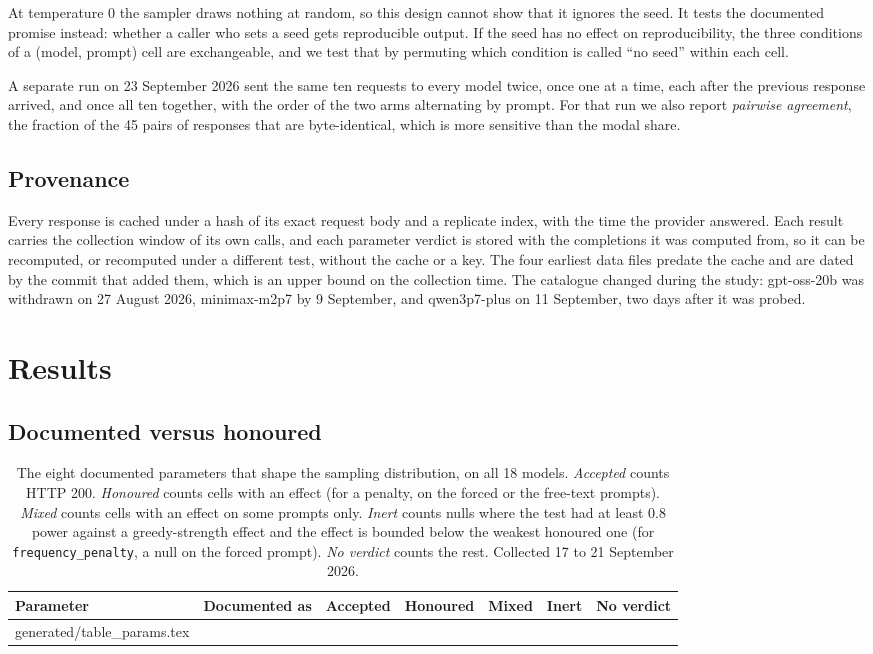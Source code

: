 \documentclass[10pt]{article}
\makeatletter
\newcommand{\p}[1]{\texttt{#1}}
\newcommand{\inputrows}[1]{\@@input #1 }
\makeatother
\begin{document}
At temperature 0 the sampler draws nothing at random, so this design cannot show that it ignores the seed. It tests the documented promise instead: whether a caller who sets a seed gets reproducible output. If the seed has no effect on reproducibility, the three conditions of a (model, prompt) cell are exchangeable, and we test that by permuting which condition is called ``no seed'' within each cell.

A separate run on 23 September 2026 sent the same ten requests to every model twice, once one at a time, each after the previous response arrived, and once all ten together, with the order of the two arms alternating by prompt. For that run we also report \emph{pairwise agreement}, the fraction of the 45 pairs of responses that are byte-identical, which is more sensitive than the modal share.

\subsection{Provenance}

Every response is cached under a hash of its exact request body and a replicate index, with the time the provider answered. Each result carries the collection window of its own calls, and each parameter verdict is stored with the completions it was computed from, so it can be recomputed, or recomputed under a different test, without the cache or a key. The four earliest data files predate the cache and are dated by the commit that added them, which is an upper bound on the collection time. The catalogue changed during the study: gpt-oss-20b was withdrawn on 27 August 2026, minimax-m2p7 by 9 September, and qwen3p7-plus on 11 September, two days after it was probed.

\section{Results}

\subsection{Documented versus honoured}
\label{sec:gap}

\begin{table}[t]
\centering
\small
\caption{The eight documented parameters that shape the sampling distribution, on all 18 models. \emph{Accepted} counts HTTP 200. \emph{Honoured} counts cells with an effect (for a penalty, on the forced or the free-text prompts). \emph{Mixed} counts cells with an effect on some prompts only. \emph{Inert} counts nulls where the test had at least 0.8 power against a greedy-strength effect and the effect is bounded below the weakest honoured one (for \p{frequency\_penalty}, a null on the forced prompt). \emph{No verdict} counts the rest. Collected 17 to 21 September 2026.}
\label{tab:gap}
\begin{tabular}{llccccc}
\toprule
Parameter & Documented as & Accepted & Honoured & Mixed & Inert & No verdict \\
\midrule
\inputrows{generated/table_params.tex}
\bottomrule
\end{tabular}
\end{table}
\end{document}
